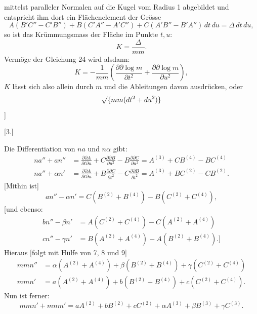 %
\noindent mittelst paralleler Normalen auf die Kugel vom Radius 1 abgebildet und entspricht ihm dort ein Flächenelement der Grösse
\[
A(B'C''-C'B'')+B(C'A''-A'C'')+C(A'B''-B'A'')\,dt\,du=\Delta\,dt\,du,
\]
so ist das Krümmungsmass der Fläche im Punkte $t,u$:
\[
K=\frac{\Delta}{mm}.
\]
Vermöge der Gleichung 24 wird alsdann:
\begin{equation}\tag*{[25]}
K=-\frac1{mm}\left(\frac{\partial\partial\log m}{\partial t^2}+\frac{\partial\partial\log m}{\partial u^2}\right),
\end{equation}
$K$ lässt sich also allein durch $m$ und die Ableitungen davon ausdrücken, oder 
\[
\mathord{\surd}\{mm(dt^2+du^2)\}
\]
]
\begin{center}[3.]\end{center}
\noindent\hspace*{1.2em} Die Differentiation von $na$ und $n\alpha$ gibt:
\[
\begin{aligned}
na''+an''&=\frac{\partial\partial A}{\partial t\partial u}+C\frac{\partial\partial B}{\partial u^2}-B\frac{\partial\partial C}{\partial u^2}=A^{(3)}+CB^{(4)}-BC^{(4)}\\
na''+\alpha n'&=\frac{\partial\partial A}{\partial t\partial u}+B\frac{\partial\partial C}{\partial t^2}-C\frac{\partial\partial B}{\partial t^2}=A^{(3)}+BC^{(2)}-CB^{(2)}.
\end{aligned}
\]
[Mithin ist]
\[
an''-\alpha n'=C(B^{(2)}+B^{(4)})-B(C^{(2)}+C^{(4)}),
\]
[und ebenso:
\[
\begin{aligned}
bn''-\beta n'&=A(C^{(2)}+C^{(4)})-C(A^{(2)}+A^{(4)})\\
cn''-\gamma n'&=B(A^{(2)}+A^{(4)})-A(B^{(2)}+B^{(4)}).]
\end{aligned}
\]
Hieraus [folgt mit Hülfe von 7, 8 und 9]
\[
\begin{aligned}
mmn''&=\alpha(A^{(2)}+A^{(4)})+\beta(B^{(2)}+B^{(4)})+\gamma(C^{(2)}+C^{(4)})\\
mmn'&=a(A^{(2)}+A^{(4)})+b(B^{(2)}+B^{(4)})+c(C^{(2)}+C^{(4)}).
\end{aligned}
\]
Nun ist ferner:
\[
mmn'+mnm'=aA^{(2)}+bB^{(2)}+cC^{(2)}+\alpha A^{(3)}+\beta B^{(3)}+\gamma C^{(3)}.
\]
